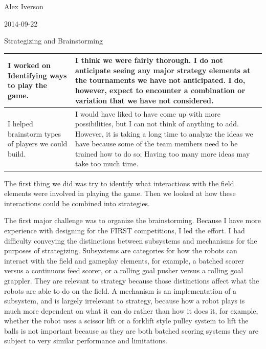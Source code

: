 Alex Iverson

2014-09-22

Strategizing and Brainstorming

\begin{tabular}{|p{5cm}|p{5cm}|}
 \hline
 I worked on Identifying ways to play the game.
 &
 I think we were fairly thorough. I do not anticipate seeing any major strategy elements at the tournaments we have not anticipated. I do, however, expect to encounter a combination or variation that we have not considered.
 \\
 \hline
 I helped brainstorm types of players we could build.
 &
 I would have liked to have come up with more possibilities, but I can not think of anything to add. However, it is taking a long time to analyze the ideas we have because some of the team members need to be trained how to do so; Having too many more ideas may take too much time.
 \\
 \hline
\end{tabular}

The first thing we did was try to identify what interactions with the field elements were involved in playing the game. Then we looked at how these interactions could be combined into strategies.

The first major challenge was to organize the brainstorming. Because I have more experience with designing for the FIRST competitions, I led the effort. I had difficulty conveying the distinctions between subsystems and mechanisms for the purposes of strategizing. Subsystems are categories for how the robots can interact with the field and gameplay elements, for example, a batched scorer versus a continuous feed scorer, or a rolling goal pusher versus a rolling goal grappler. They are relevant to strategy because those distinctions affect what the robots are able to do on the field. A mechanism is an implementation of a subsystem, and is largely irrelevant to strategy, because how a robot plays is much more dependent on what it can do rather than how it does it, for example, whether the robot uses a scissor lift or a forklift style pulley system to lift the balls is not important because as they are both batched scoring systems they are subject to very similar performance and limitations.

